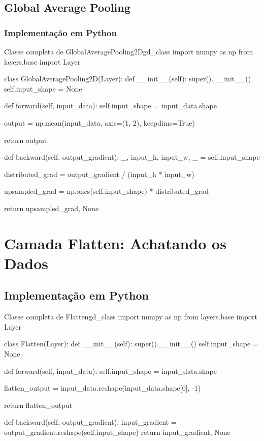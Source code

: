 \subsection{Global Average Pooling}

\subsubsection{Implementação em Python}

\begin{codelisting}{Classe completa de GlobalAveragePooling2D}{gd_class}
import numpy as np
from layers.base import Layer

class GlobalAveragePooling2D(Layer):
    def __init__(self):
        super().__init__()
        self.input_shape = None

    def forward(self, input_data):
        self.input_shape = input_data.shape

        output = np.mean(input_data, axis=(1, 2), keepdims=True)

        return output

    def backward(self, output_gradient):
        _, input_h, input_w, _ = self.input_shape

        distributed_grad = output_gradient / (input_h * input_w)

        upsampled_grad = np.ones(self.input_shape) * distributed_grad

        return upsampled_grad, None
\end{codelisting}

\section{Camada Flatten: Achatando os Dados}

\subsection{Implementação em Python}

\begin{codelisting}{Classe completa de Flatten}{gd_class}
import numpy as np
from layers.base import Layer

class Flatten(Layer):
    def __init__(self):
        super().__init__()
        self.input_shape = None

    def forward(self, input_data):
        self.input_shape = input_data.shape

        flatten_output = input_data.reshape(input_data.shape[0], -1)

        return flatten_output

    def backward(self, output_gradient):
        input_gradient = output_gradient.reshape(self.input_shape)
        return input_gradient, None
\end{codelisting}


